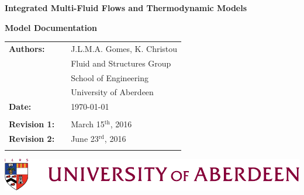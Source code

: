 \documentclass[11pts,a4paper,amsmath,amssymb,floatfix]{book}
\theoremstyle{definition}
\theoremstyle{plain}
\theoremstyle{definition}
\theoremstyle{remark}
\begin{document}
\vspace{4cm}

\begin{titlepage}
  \begin{center}
\vspace{3.5cm}

       {\bf{\Huge Integrated Multi-Fluid Flows and Thermodynamic Models}}

\bigskip
       {\bf{\huge Model Documentation}}

\vspace{3.5cm}

  \end{center}

  \begin{tabular}{l c l}
     {\bf{\large Authors:}}                         &     & J.L.M.A. Gomes, K. Christou \\
                                                    &     & Fluid and Structures Group \\
                                                    &     & School of Engineering \\
                                                    &     & University of Aberdeen \\
\bigskip
     {\bf{\large Date:}}                            &     &   \today                    \\
                                                    &     &                             \\
     {\bf{\large Revision 1:}}                      &     &  March 15$^{\text{th}}$, 2016  \\
     {\bf{\large Revision 2:}}                      &     &  June 23$^{\text{rd}}$, 2016   \\
                                                    &     &                             \\
  \end{tabular}
\vspace{3.5cm}

\bigskip

\bigskip


   \includegraphics[width=15cm,clip]{./FigBanner/UoAHorizBanner}



\end{titlepage}
\end{document}
